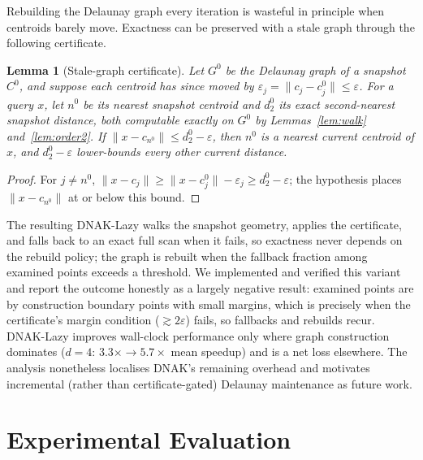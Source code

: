 \documentclass[review,12pt]{elsarticle}
\newtheorem{lemma}{Lemma}
\begin{document}
Rebuilding the Delaunay graph every iteration is wasteful in principle
when centroids barely move. Exactness can be preserved with a stale
graph through the following certificate.

\begin{lemma}[Stale-graph certificate]\label{lem:stale}
Let $G^0$ be the Delaunay graph of a snapshot $C^0$, and suppose each
centroid has since moved by $\varepsilon_j=\lVert c_j-c^0_j\rVert\le
\varepsilon$. For a query $x$, let $n^0$ be its nearest snapshot
centroid and $d^0_2$ its exact second-nearest snapshot distance, both
computable exactly on $G^0$ by Lemmas~\ref{lem:walk}
and~\ref{lem:order2}. If $\lVert x-c_{n^0}\rVert\le
d^0_2-\varepsilon$, then $n^0$ is a nearest current centroid of $x$,
and $d^0_2-\varepsilon$ lower-bounds every other current distance.
\end{lemma}
\begin{proof}
For $j\neq n^0$, $\lVert x-c_j\rVert\ge\lVert
x-c^0_j\rVert-\varepsilon_j\ge d^0_2-\varepsilon$; the hypothesis
places $\lVert x-c_{n^0}\rVert$ at or below this bound.
\end{proof}

The resulting DNAK-Lazy walks the snapshot geometry, applies the
certificate, and falls back to an exact full scan when it fails, so
exactness never depends on the rebuild policy; the graph is rebuilt
when the fallback fraction among examined points exceeds a threshold.
We implemented and verified this variant and report the outcome
honestly as a largely negative result: examined points are by
construction boundary points with small margins, which is precisely
when the certificate's margin condition ($\gtrsim 2\varepsilon$)
fails, so fallbacks and rebuilds recur. DNAK-Lazy improves wall-clock
performance only where graph construction dominates ($d{=}4$:
$3.3\times\to 5.7\times$ mean speedup) and is a net loss elsewhere.
The analysis nonetheless localises DNAK's remaining overhead and
motivates incremental (rather than certificate-gated) Delaunay
maintenance as future work.

\section{Experimental Evaluation}
\label{sec:exp}
\end{document}
